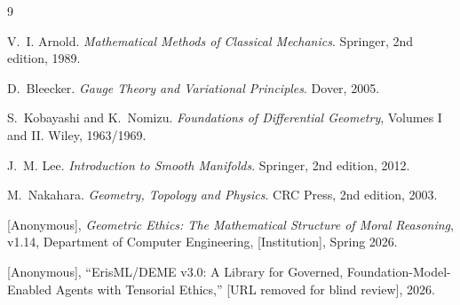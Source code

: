 \documentclass[12pt]{article}
\theoremstyle{definition}
\theoremstyle{remark}
\begin{document}

\begin{thebibliography}{9}

V.~I. Arnold.
\newblock \emph{Mathematical Methods of Classical Mechanics}.
\newblock Springer, 2nd edition, 1989.

D.~Bleecker.
\newblock \emph{Gauge Theory and Variational Principles}.
\newblock Dover, 2005.

S.~Kobayashi and K.~Nomizu.
\newblock \emph{Foundations of Differential Geometry}, Volumes I and II.
\newblock Wiley, 1963/1969.

J.~M. Lee.
\newblock \emph{Introduction to Smooth Manifolds}.
\newblock Springer, 2nd edition, 2012.

M.~Nakahara.
\newblock \emph{Geometry, Topology and Physics}.
\newblock CRC Press, 2nd edition, 2003.

[Anonymous], \emph{Geometric Ethics: The Mathematical Structure of Moral Reasoning}, v1.14, Department of Computer Engineering, [Institution], Spring 2026.

[Anonymous], ``ErisML/DEME v3.0: A Library for Governed, Foundation-Model-Enabled Agents with Tensorial Ethics,'' [URL removed for blind review], 2026.

\end{thebibliography}
\end{document}
